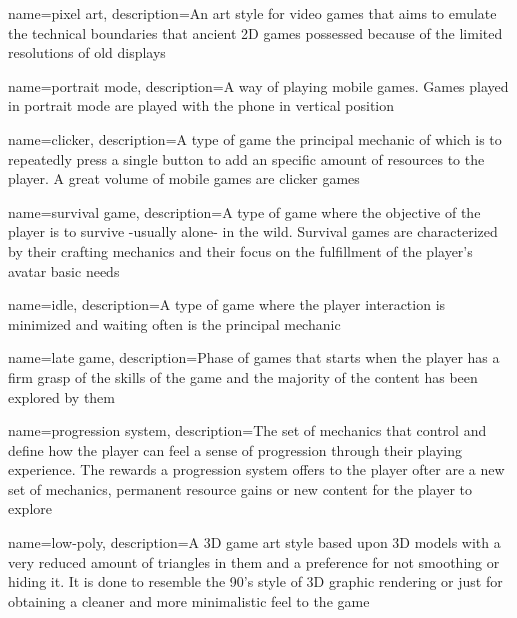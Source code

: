 \makeglossaries

{
    name=pixel art,
    description={An art style for video games that aims to emulate the technical boundaries that ancient 2D games possessed because of the limited resolutions of old displays}
}

{
    name=portrait mode,
    description={A way of playing mobile games. Games played in portrait mode are played  with the phone in vertical position}
}

{
    name=clicker,
    description={A type of game the principal mechanic of which is to repeatedly press a single button to add an specific amount of resources to the player. A great volume of mobile games are clicker games}
}


{
    name=survival game,
    description={A type of game where the objective of the player is to survive -usually alone- in the wild. Survival games are characterized by their crafting mechanics and their focus on the fulfillment of the player's avatar basic needs}
}

{
    name=idle,
    description={A type of game where the player interaction is minimized and waiting often is the principal mechanic}
}

{
    name=late game,
    description={Phase of games that starts when the player has a firm grasp of the skills of the game and the majority of the content has been explored by them}
}

{
    name=progression system,
    description={The set of mechanics that control and define how the player can feel a sense of progression through their playing experience. The rewards a progression system offers to the player ofter are a new set of mechanics, permanent resource gains or new content for the player to explore}
}

{
    name=low-poly,
    description={A 3D game art style based upon 3D models with a very reduced amount of triangles in them and a preference for not smoothing or hiding it. It is done to resemble the 90's style of 3D graphic rendering or just for obtaining a cleaner and more minimalistic feel to the game}
}


